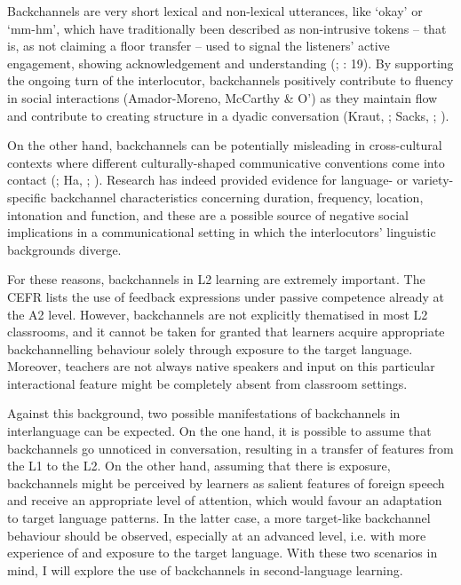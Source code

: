 Backchannels are very short lexical and non-lexical utterances, like ‘okay’ or ‘mm-hm’, which have traditionally been described as non-intrusive tokens – that is, as not claiming a floor transfer – used to signal the listeners’ active engagement, showing acknowledgement and understanding (\citealt{Schegloff1982}; \citealt{Yngve1970}: 19). By supporting the ongoing turn of the interlocutor, backchannels positively contribute to fluency in social interactions (Amador-Moreno, McCarthy \& O’\citealt{Keeffe2013}) as they maintain flow and contribute to creating structure in a dyadic conversation (Kraut, \citealt{LewisSwezey1982}; Sacks, \citealt{SchegloffJefferson1974}; \citealt{Schegloff1982}).

On the other hand, backchannels can be potentially misleading in cross-cultural contexts where different culturally-shaped communicative conventions come into contact (\citealt{Cutrone2005,Cutrone2014}; Ha, \citealt{EbnerGrice2016}; \citealt{Li2006}). Research has indeed provided evidence for language- or variety-specific backchannel characteristics concerning duration, frequency, location, intonation and function, and these are a possible source of negative social implications in a communicational setting in which the interlocutors’ linguistic backgrounds diverge.

For these reasons, backchannels in L2 learning are extremely important. The CEFR \citep{FiguerasEtAl2009} lists the use of feedback expressions under passive competence already at the A2 level. However, backchannels are not explicitly thematised in most L2 classrooms, and it cannot be taken for granted that learners acquire appropriate backchannelling behaviour solely through exposure to the target language. Moreover, teachers are not always native speakers and input on this particular interactional feature might be completely absent from classroom settings.

Against this background, two possible manifestations of backchannels in interlanguage can be expected. On the one hand, it is possible to assume that backchannels go unnoticed in conversation, resulting in a transfer of features from the L1 to the L2. On the other hand, assuming that there is exposure, backchannels might be perceived by learners as salient features of foreign speech and receive an appropriate level of attention, which would favour an adaptation to target language patterns. In the latter case, a more target-like backchannel behaviour should be observed, especially at an advanced level, i.e. with more experience of and exposure to the target language. With these two scenarios in mind, I will explore the use of backchannels in second-language learning.


